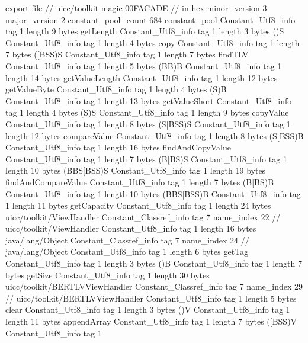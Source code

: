 export file {		// uicc/toolkit
	magic	00FACADE		 // in hex
	minor_version	3
	major_version	2
	constant_pool_count	684
	constant_pool {
		Constant_Utf8_info {
			tag	1
			length	9
			bytes	getLength
		}
		Constant_Utf8_info {
			tag	1
			length	3
			bytes	()S
		}
		Constant_Utf8_info {
			tag	1
			length	4
			bytes	copy
		}
		Constant_Utf8_info {
			tag	1
			length	7
			bytes	([BSS)S
		}
		Constant_Utf8_info {
			tag	1
			length	7
			bytes	findTLV
		}
		Constant_Utf8_info {
			tag	1
			length	5
			bytes	(BB)B
		}
		Constant_Utf8_info {
			tag	1
			length	14
			bytes	getValueLength
		}
		Constant_Utf8_info {
			tag	1
			length	12
			bytes	getValueByte
		}
		Constant_Utf8_info {
			tag	1
			length	4
			bytes	(S)B
		}
		Constant_Utf8_info {
			tag	1
			length	13
			bytes	getValueShort
		}
		Constant_Utf8_info {
			tag	1
			length	4
			bytes	(S)S
		}
		Constant_Utf8_info {
			tag	1
			length	9
			bytes	copyValue
		}
		Constant_Utf8_info {
			tag	1
			length	8
			bytes	(S[BSS)S
		}
		Constant_Utf8_info {
			tag	1
			length	12
			bytes	compareValue
		}
		Constant_Utf8_info {
			tag	1
			length	8
			bytes	(S[BSS)B
		}
		Constant_Utf8_info {
			tag	1
			length	16
			bytes	findAndCopyValue
		}
		Constant_Utf8_info {
			tag	1
			length	7
			bytes	(B[BS)S
		}
		Constant_Utf8_info {
			tag	1
			length	10
			bytes	(BBS[BSS)S
		}
		Constant_Utf8_info {
			tag	1
			length	19
			bytes	findAndCompareValue
		}
		Constant_Utf8_info {
			tag	1
			length	7
			bytes	(B[BS)B
		}
		Constant_Utf8_info {
			tag	1
			length	10
			bytes	(BBS[BSS)B
		}
		Constant_Utf8_info {
			tag	1
			length	11
			bytes	getCapacity
		}
		Constant_Utf8_info {
			tag	1
			length	24
			bytes	uicc/toolkit/ViewHandler
		}
		Constant_Classref_info {
			tag	7
			name_index	22		// uicc/toolkit/ViewHandler
		}
		Constant_Utf8_info {
			tag	1
			length	16
			bytes	java/lang/Object
		}
		Constant_Classref_info {
			tag	7
			name_index	24		// java/lang/Object
		}
		Constant_Utf8_info {
			tag	1
			length	6
			bytes	getTag
		}
		Constant_Utf8_info {
			tag	1
			length	3
			bytes	()B
		}
		Constant_Utf8_info {
			tag	1
			length	7
			bytes	getSize
		}
		Constant_Utf8_info {
			tag	1
			length	30
			bytes	uicc/toolkit/BERTLVViewHandler
		}
		Constant_Classref_info {
			tag	7
			name_index	29		// uicc/toolkit/BERTLVViewHandler
		}
		Constant_Utf8_info {
			tag	1
			length	5
			bytes	clear
		}
		Constant_Utf8_info {
			tag	1
			length	3
			bytes	()V
		}
		Constant_Utf8_info {
			tag	1
			length	11
			bytes	appendArray
		}
		Constant_Utf8_info {
			tag	1
			length	7
			bytes	([BSS)V
		}
		Constant_Utf8_info {
			tag	1
}}}
